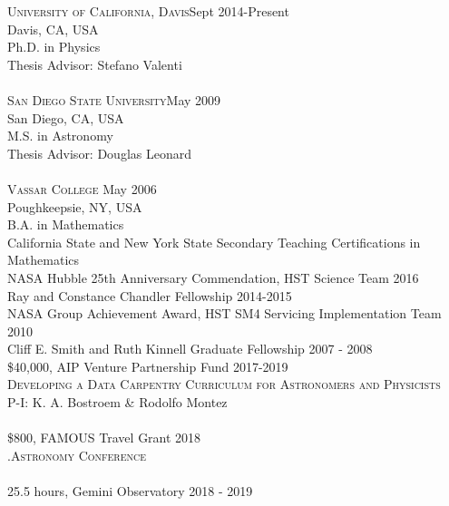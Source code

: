 \documentclass[10pt]{cv}
\begin{document}
\begin{llist}
\vspace{0.1in} 
\textsc{University of California, Davis}\hfill Sept 2014-Present\\
Davis, CA, USA \\
Ph.D. in Physics \\
Thesis Advisor: Stefano Valenti \\
\\
\textsc{San Diego State University}\hfill May 2009\\
San Diego, CA, USA \\
M.S. in Astronomy \\
Thesis Advisor: Douglas Leonard \\
\\
\textsc{Vassar College} \hfill May 2006 \\
Poughkeepsie, NY, USA \\
B.A. in Mathematics \\
California State and New York State Secondary Teaching Certifications in Mathematics \\
\vspace{-0.1in}   
NASA Hubble 25th Anniversary Commendation, HST Science Team \hfill 2016 \\ %
Ray and Constance Chandler Fellowship \hfill 2014-2015 \\
NASA Group Achievement Award, HST SM4 Servicing Implementation Team \hfill2010 \\
Cliff E. Smith and Ruth Kinnell Graduate Fellowship \hfill 2007 - 2008\\
\vspace{-0.1in}   
\$40,000, AIP Venture Partnership Fund \hfill 2017-2019\\
\textsc{Developing a Data Carpentry Curriculum for Astronomers and Physicists}\\
P-I: K. A. Bostroem \& Rodolfo Montez\\
\\
\$800, FAMOUS Travel Grant \hfill2018\\ 
\textsc{.Astronomy Conference}\\
\\
25.5 hours, Gemini Observatory \hfill 2018 - 2019\\

\end{llist}
\end{document}
